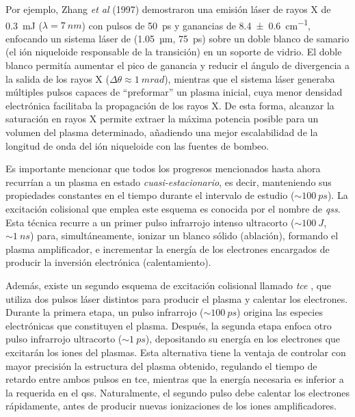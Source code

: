Por ejemplo, Zhang \emph{et al} (1997)\autocite{Zhang1997} demostraron una emisión láser de rayos X de \qty{0.3}{mJ} ($\lambda = \qty{7}{nm}$) con pulsos de \qty{50}{ps} y ganancias de \qty{8.4 +- 0.6}{cm^{-1}}, enfocando un sistema láser de  (\qty{1.05}{µm}, \qty{75}{ps}) sobre un doble blanco de samario (el ión niqueloide responsable de la transición) en un soporte de vidrio. El doble blanco permitía aumentar el pico de ganancia y reducir el ángulo de divergencia a la salida de los rayos X ($\Delta \theta \approx \qty{1}{mrad}$), mientras que el sistema láser generaba múltiples pulsos capaces de \enquote{preformar} un plasma inicial, cuya menor densidad electrónica facilitaba la propagación de los rayos X. De esta forma, alcanzar la saturación en rayos X permite extraer la máxima potencia posible para un volumen del plasma determinado, añadiendo una mejor escalabilidad de la longitud de onda del ión niqueloide con las fuentes de bombeo.

Es importante mencionar que todos los progresos mencionados hasta ahora recurrían a un plasma en estado \emph{cuasi-estacionario}, es decir, manteniendo sus propiedades constantes en el tiempo durante el intervalo de estudio ($\sim \qty{100}{ps}$). La excitación colisional que emplea este esquema es conocida por el nombre de \emph{\acrfull{qss}}. Esta técnica \autocite{Rus2002} recurre a un primer pulso infrarrojo intenso ultracorto ($\sim  \qty{100}{J}$, $\sim \qty{1}{ns}$) para, simultáneamente, ionizar un blanco sólido (ablación), formando el plasma amplificador, e incrementar la energía de los electrones encargados de producir la inversión electrónica (calentamiento).

Además, existe un segundo esquema de excitación colisional llamado \emph{\acrfull{tce}} \autocite{Nickles1997}, que utiliza dos pulsos láser distintos para producir el plasma y calentar los electrones. Durante la primera etapa, un pulso infrarrojo ($\sim \qty{100}{ps}$) origina las especies electrónicas que constituyen el plasma. Después, la segunda etapa enfoca otro pulso infrarrojo ultracorto ($\sim \qty{1}{ps}$), depositando su energía en los electrones que excitarán los iones del plasmas. Esta alternativa tiene la ventaja de controlar con mayor precisión la estructura del plasma obtenido, regulando el tiempo de retardo entre ambos pulsos en \acrshort{tce}, mientras que la energía necesaria es inferior a la requerida en el \acrshort{qss}. Naturalmente, el segundo pulso debe calentar los electrones rápidamente, antes de producir nuevas ionizaciones de los iones amplificadores.

